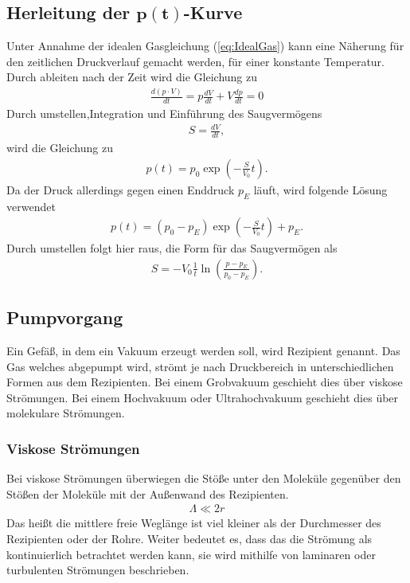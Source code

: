 \subsection[Herleitung der $p(t)$-Kurve]{Herleitung der $\mathbf{p(t)}$-Kurve}
Unter Annahme der idealen Gasgleichung (\ref{eq:IdealGas})
kann eine Näherung für den zeitlichen Druckverlauf gemacht werden, für einer konstante Temperatur.
Durch ableiten nach der Zeit wird die Gleichung zu
\begin{align}
\frac{d\left(p\cdot V \right)}{dt}=p\frac{dV}{dt}+V\frac{dp}{dt}=0
\end{align}
Durch umstellen,Integration und Einführung des Saugvermögens 
\begin{align}
S=\frac{dV}{dt},
\end{align}
wird die Gleichung zu
\begin{align}
p(t) = p_0 \exp\left(-\frac{S}{V_0}t\right).
\end{align}
Da der Druck allerdings gegen einen Enddruck $p_E$ läuft, wird folgende Lösung verwendet
\begin{align}
p(t) = \left( p_0-p_E \right) \exp\left(-\frac{S}{V_0}t\right) + p_E.
\label{eq:Evakuierungskurve}
\end{align}
Durch umstellen folgt hier raus, die Form für das Saugvermögen als
\begin{align}
S=-V_0\frac{1}{t}\ln \left( \frac{p-p_E}{p_0-p_E} \right).
\label{eq:Saugvermoegen_Evakuierungskurve}
\end{align}
\subsection{Pumpvorgang}
Ein Gefäß, in dem ein Vakuum erzeugt werden soll, wird Rezipient genannt. Das Gas welches abgepumpt wird, strömt je nach Druckbereich in unterschiedlichen Formen aus dem Rezipienten. Bei einem Grobvakuum geschieht dies über viskose Strömungen.
Bei einem Hochvakuum oder Ultrahochvakuum geschieht dies über molekulare Strömungen.
\subsubsection{Viskose Strömungen}
Bei viskose Strömungen überwiegen die Stöße unter den Moleküle gegenüber den Stößen der Moleküle mit der Außenwand des Rezipienten.
\begin{align}
 \Lambda \ll 2 r
\end{align}
Das heißt die mittlere freie Weglänge ist viel kleiner als der Durchmesser des Rezipienten oder der Rohre. Weiter bedeutet es, dass das die Strömung als kontinuierlich betrachtet werden kann, sie wird mithilfe von laminaren oder turbulenten Strömungen beschrieben.
